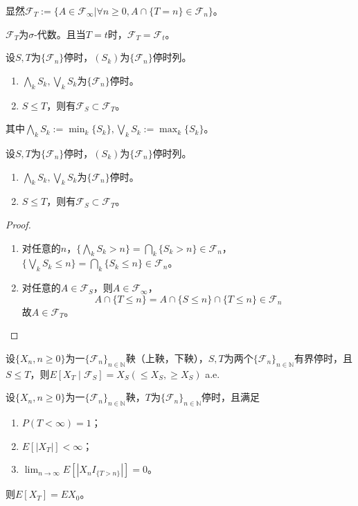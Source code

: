 \documentclass[lang=cn,10pt,thmcnt=section]{elegantbook}
\begin{document}
显然$\mathcal{F}_T := \{A \in \mathcal{F}_\infty | \forall n \geq 0, A \cap \{T = n\} \in \mathcal{F}_n\}$。

$\mathcal{F}_T$为$\sigma$-代数。且当$T = t$时，$\mathcal{F}_T = \mathcal{F}_t$。
\begin{theorem}
	设$S, T$为$\{\mathcal{F}_n\}$停时，$(S_k)$为$\{\mathcal{F}_n\}$停时列。
\begin{enumerate}
    \item $\bigwedge_k S_k, \bigvee_k S_k$为$\{\mathcal{F}_n\}$停时。
    \item $S \leq T$，则有$\mathcal{F}_S \subset \mathcal{F}_T$。
\end{enumerate}
其中$\bigwedge_k S_k := \min_k \{S_k\}, \bigvee_k S_k := \max_k \{S_k\}$。
\end{theorem}
\begin{theorem}
	设$S, T$为$\{\mathcal{F}_n\}$停时，$(S_k)$为$\{\mathcal{F}_n\}$停时列。
\begin{enumerate}
    \item $\bigwedge_k S_k, \bigvee_k S_k$为$\{\mathcal{F}_n\}$停时。
    \item $S \leq T$，则有$\mathcal{F}_S \subset \mathcal{F}_T$。
\end{enumerate}

\end{theorem}
\begin{proof}
	\begin{enumerate}
		\item 对任意的$n$，$\{\bigwedge_k S_k > n\} = \bigcap_k \{S_k > n\} \in \mathcal{F}_n$，$\{\bigvee_k S_k \leq n\} = \bigcap_k \{S_k \leq n\} \in \mathcal{F}_n$。
		\item 对任意的$A \in \mathcal{F}_S$，则$A \in \mathcal{F}_\infty$，
		\[
		A \cap \{T \leq n\} = A \cap \{S \leq n\} \cap \{T \leq n\} \in \mathcal{F}_n
		\]
		故$A \in \mathcal{F}_T$。
	\end{enumerate}
\end{proof}
\begin{theorem}
	设$\{X_n, n \geq 0\}$为一$\{\mathcal{F}_n\}_{n \in \mathbb{N}}$鞅（上鞅，下鞅），$S, T$为两个$\{\mathcal{F}_n\}_{n \in \mathbb{N}}$有界停时，且$S \leq T$，则$E[X_T \mid \mathcal{F}_S] = X_S (\leq X_S, \geq X_S)$ a.e.
\end{theorem}
\begin{theorem}
	设$\{X_n, n \geq 0\}$为一$\{\mathcal{F}_n\}_{n \in \mathbb{N}}$鞅，$T$为$\{\mathcal{F}_n\}_{n \in \mathbb{N}}$停时，且满足
\begin{enumerate}
    \item $P(T < \infty) = 1$；
    \item $E[|X_T|] < \infty$；
    \item $\lim_{n \to \infty} E[|X_n I_{\{T > n\}}|] = 0$。
\end{enumerate}
则$E[X_T] = EX_0$。
\end{theorem}
\end{document}

